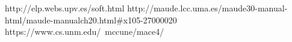 http://elp.webs.upv.es/soft.html
http://maude.lcc.uma.es/maude30-manual-html/maude-manualch20.html#x105-27000020
https://www.cs.unm.edu/~mccune/mace4/
